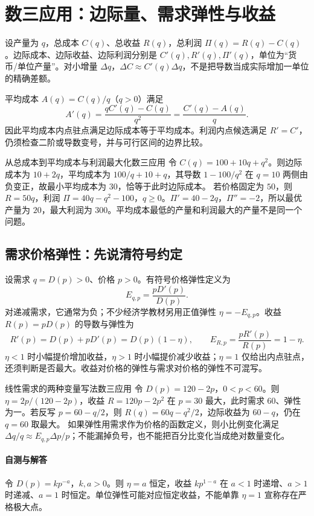\section{数三应用：边际量、需求弹性与收益}\label{r2:economics}
设产量为 $q$，总成本 $C(q)$、总收益 $R(q)$，总利润 $\Pi(q)=R(q)-C(q)$。边际成本、边际收益、边际利润分别是 $C'(q),R'(q),\Pi'(q)$，单位为“货币/单位产量”。对小增量 $\Delta q$，$\Delta C\approx C'(q)\Delta q$，不是把导数当成实际增加一单位的精确差额。

平均成本 $A(q)=C(q)/q$（$q>0$）满足
\[
 A'(q)=\frac{qC'(q)-C(q)}{q^2}=\frac{C'(q)-A(q)}q.
\]
因此平均成本内点驻点满足边际成本等于平均成本。利润内点候选满足 $R'=C'$，仍须检查二阶或导数变号，并与可行区间的边界比较。

\begin{example}{从总成本到平均成本与利润最大化}{数三应用}
令 $C(q)=100+10q+q^2$。则边际成本为 $10+2q$，平均成本为 $100/q+10+q$，其导数 $1-100/q^2$ 在 $q=10$ 两侧由负变正，故最小平均成本为 $30$，恰等于此时边际成本。
若价格固定为 $50$，则 $R=50q$，利润 $\Pi=40q-q^2-100$，$q\ge0$。$\Pi'=40-2q$，$\Pi''=-2$，所以最优产量为 $20$，最大利润为 $300$。平均成本最低的产量和利润最大的产量不是同一个问题。
\end{example}

\subsection{需求价格弹性：先说清符号约定}
设需求 $q=D(p)>0$、价格 $p>0$。有符号价格弹性定义为
\[
 E_{q,p}=\frac{pD'(p)}{D(p)}.
\]
对递减需求，它通常为负；不少经济学教材另用正值弹性 $\eta=-E_{q,p}$。收益 $R(p)=pD(p)$ 的导数与弹性为
\[
 R'(p)=D(p)+pD'(p)=D(p)(1-\eta),\qquad
 E_{R,p}=\frac{pR'(p)}{R(p)}=1-\eta.
\]
$\eta<1$ 时小幅提价增加收益，$\eta>1$ 时小幅提价减少收益；$\eta=1$ 仅给出内点驻点，还须判断是否最大。收益对价格的弹性与需求对价格的弹性不可混写。

\begin{example}{线性需求的两种变量写法}{数三应用}
令 $D(p)=120-2p$，$0<p<60$。则 $\eta=2p/(120-2p)$，收益 $R=120p-2p^2$ 在 $p=30$ 最大，此时需求 $60$、弹性为一。若反写 $p=60-q/2$，则 $R(q)=60q-q^2/2$，边际收益为 $60-q$，仍在 $q=60$ 取最大。
如果弹性用需求作为价格的函数定义，则小比例变化满足 $\Delta q/q\approx E_{q,p}\Delta p/p$；不能漏掉负号，也不能把百分比变化当成绝对数量变化。
\end{example}

\paragraph{自测与解答}
令 $D(p)=kp^{-a}$，$k,a>0$。则 $\eta=a$ 恒定，收益 $kp^{1-a}$ 在 $a<1$ 时递增、$a>1$ 时递减、$a=1$ 时恒定。单位弹性可能对应恒定收益，不能单靠 $\eta=1$ 宣称存在严格极大点。
